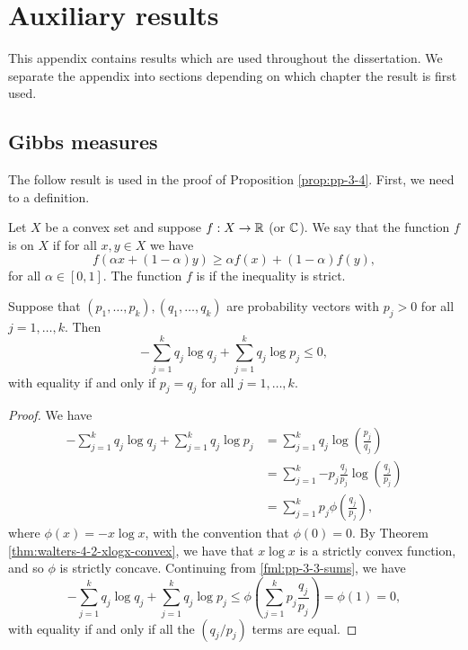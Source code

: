 \chapter{Auxiliary results}
This appendix contains results which are used throughout the dissertation. We separate the appendix into sections depending on which chapter the result is first used.

\section{Gibbs measures}
The follow result is used in the proof of Proposition \ref{prop:pp-3-4}. First, we need to a definition.

\begin{definition}
	Let $X$ be a convex set and suppose $f : X \to \mathbb{R}$ (or $\mathbb{C}$). We say that the function $f$ is  on $X$ if for all $x, y \in X$ we have
	\[
		f(\alpha x + (1 - \alpha)y) \geq \alpha f(x) + (1 - \alpha)f(y),
	\]
	for all $\alpha \in [0, 1]$. The function $f$ is  if the inequality is strict.~\cite[p11]{cambini-martein:generalized}
\end{definition}

\begin{lemma} \label{lem:pp-3-3}
	Suppose that $(p_1, \dots, p_k), (q_1, \dots, q_k)$ are probability vectors with $p_j > 0$ for all $j = 1, \dots, k$. Then
	\[
		-\sum_{j = 1}^k{q_j \log{q_j}} + \sum_{j = 1}^k{q_j \log{p_j}} \leq 0,
	\]
	with equality if and only if $p_j = q_j$ for all $j = 1, \dots, k$.
	\begin{proof}
		We have
		\begin{align}
			-\sum_{j = 1}^k{q_j \log{q_j}} + \sum_{j = 1}^k{q_j \log{p_j}} &= \sum_{j = 1}^k{q_j \log\left(\frac{p_j}{q_j}\right)} \nonumber \\
				&= \sum_{j = 1}^k{-p_j \frac{q_j}{p_j} \log\left(\frac{q_j}{p_j}\right)} \nonumber \\
				&= \sum_{j = 1}^k{p_j \phi\left(\frac{q_j}{p_j}\right)}, \label{fml:pp-3-3-sums}
		\end{align}
		where $\phi(x) = -x \log{x}$, with the convention that $\phi(0) = 0$. By Theorem \ref{thm:walters-4-2-xlogx-convex}, we have that $x \log{x}$ is a strictly convex function, and so $\phi$ is strictly concave. Continuing from \eqref{fml:pp-3-3-sums}, we have
		\[
			-\sum_{j = 1}^k{q_j \log{q_j}} + \sum_{j = 1}^k{q_j \log{p_j}} \leq \phi\left(\sum_{j = 1}^k{p_j \frac{q_j}{p_j}}\right) = \phi(1) = 0,
		\]
		with equality if and only if all the $(q_j / p_j)$ terms are equal.
	\end{proof}
\end{lemma}

